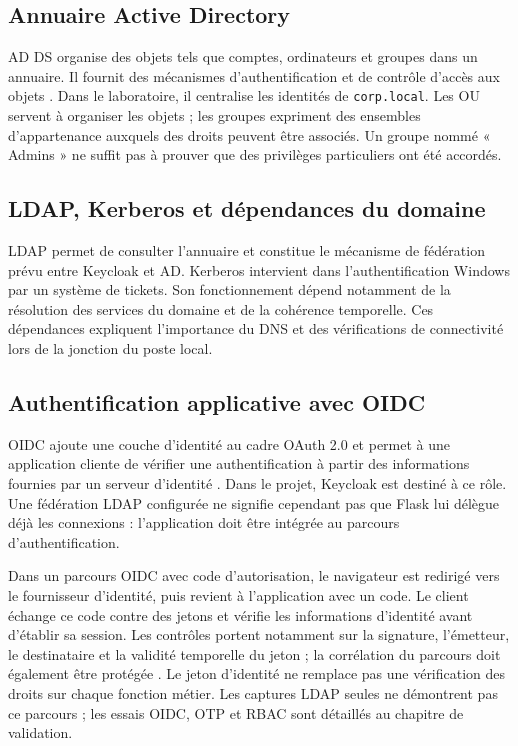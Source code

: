 \documentclass[a4paper,12pt]{report}
\begin{document}
\subsection{Annuaire Active Directory}
AD DS organise des objets tels que comptes, ordinateurs et groupes dans un annuaire. Il fournit des mécanismes d'authentification et de contrôle d'accès aux objets \cite{ad}. Dans le laboratoire, il centralise les identités de \texttt{corp.local}. Les OU servent à organiser les objets ; les groupes expriment des ensembles d'appartenance auxquels des droits peuvent être associés. Un groupe nommé « Admins » ne suffit pas à prouver que des privilèges particuliers ont été accordés.

\subsection{LDAP, Kerberos et dépendances du domaine}
LDAP permet de consulter l'annuaire et constitue le mécanisme de fédération prévu entre Keycloak et AD. Kerberos intervient dans l'authentification Windows par un système de tickets. Son fonctionnement dépend notamment de la résolution des services du domaine et de la cohérence temporelle. Ces dépendances expliquent l'importance du DNS et des vérifications de connectivité lors de la jonction du poste local.

\subsection{Authentification applicative avec OIDC}
OIDC ajoute une couche d'identité au cadre OAuth 2.0 et permet à une application cliente de vérifier une authentification à partir des informations fournies par un serveur d'identité \cite{oidc}. Dans le projet, Keycloak est destiné à ce rôle. Une fédération LDAP configurée ne signifie cependant pas que Flask lui délègue déjà les connexions : l'application doit être intégrée au parcours d'authentification.

Dans un parcours OIDC avec code d'autorisation, le navigateur est redirigé vers le fournisseur d'identité, puis revient à l'application avec un code. Le client échange ce code contre des jetons et vérifie les informations d'identité avant d'établir sa session. Les contrôles portent notamment sur la signature, l'émetteur, le destinataire et la validité temporelle du jeton ; la corrélation du parcours doit également être protégée \cite{oidc}. Le jeton d'identité ne remplace pas une vérification des droits sur chaque fonction métier. Les captures LDAP seules ne démontrent pas ce parcours ; les essais OIDC, OTP et RBAC sont détaillés au chapitre de validation.
\end{document}
